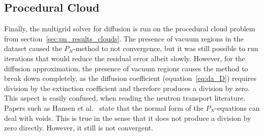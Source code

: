 \subsection{Procedural Cloud}
\label{sec:da_results_clouds}

Finally, the multigrid solver for diffusion is run on the procedural cloud problem from section~\ref{sec:pn_results_clouds}. The presence of vacuum regions in the dataset caused the $P_N$-method to not convergence, but it was still possible to run iterations that would reduce the residual error albeit slowly. However, for the diffusion approximation, the presence of vacuum regions causes the method to break down completely, as the diffusion coefficient (equation~\ref{eq:da_D}) requires division by the extinction coefficient and therefore produces a division by zero. This aspect is easily confused, when reading the neutron transport literature. Papers such as Hansen et al.~\cite{Hansen14} state that the normal form of the $P_N$-equations can deal with voids. This is true in the sense that it does not produce a division by zero directly. However, it still is not convergent.

